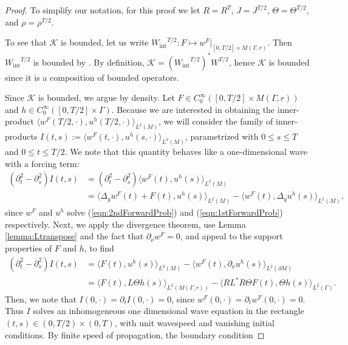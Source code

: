 \documentclass[final,leqno]{siamart1116}
\begin{document}
\begin{proof}
  To simplify our notation, for this proof we let $R = R^T$, $J =
  J^{T/2}$, $\Theta = \Theta^{T/2}$, and $\rho = \rho^{T/2}$.

  To see that ${\mathcal{K}}$ is bounded, let us write ${W_{\text{int}}}^{T/2} : F
  \mapsto w^F|_{[0,T/2] \times M(\Gamma,r)}$. Then ${W_{\text{int}}}^{T/2}$ is
  bounded by \cite{Lions1972a}. By definition, ${\mathcal{K}} =
  ({W_{\text{int}}}^{T/2})^* W^{T/2}$, hence ${\mathcal{K}}$ is bounded since it is a
  composition of bounded operators.
  

  Since ${\mathcal{K}}$ is bounded, we  argue by density. Let
  $F \in C_0^\infty([0,T/2] \times M(\Gamma,r))$ and $h \in
  C_0^\infty([0,T/2] \times \Gamma)$.  Because we are interested in
  obtaining the inner-product $\langle
  w^F(T/2,\cdot),u^h(T/2,\cdot)\rangle_{L^2(M)}$, we will consider the
  family of inner-products $I(t,s) := \langle
  w^F(t,\cdot),u^h(s,\cdot)\rangle_{L^2(M)}$, parametrized with $0\leq
  s \leq T$ and $0 \leq t \leq T/2$. We note that this quantity
  behaves like a one-dimensional wave with a forcing term:
  \begin{align*}
    ({\partial}_t^2 - {\partial}_s^2)I(t,s) &=({\partial}_t^2 - {\partial}_s^2) \langle w^F(t), u^h(s)\rangle_{L^2(M)} \\
                            &=\langle \Delta_g w^F(t) + F(t), u^h(s) \rangle_{L^2(M)} - \langle w^F(t), \Delta_g u^h(s)\rangle_{L^2(M)},
  \end{align*}
  since $w^F$ and $u^h$ solve (\ref{eqn:2ndForwardProb}) and
  (\ref{eqn:1stForwardProb}) respectively. Next, we apply the
  divergence theorem, use Lemma \ref{lemma:Ltranspose} and the fact
  that ${\partial}_\nu w^F = 0$, and appeal to the support properties of $F$
  and $h$, to find
  \begin{align*}
    ({\partial}_t^2 - {\partial}_s^2)I(t,s) &= \langle F(t), u^h(s) \rangle_{L^2(M)} - \langle w^F(t), {\partial}_\nu u^h(s) \rangle_{L^2({\partial} M)}\\
    &=\langle F(t), L  \Theta h(s) \rangle_{L^2(M(\Gamma,r))} - \langle RL^* R \Theta F(t), \Theta h(s)\rangle_{L^2(\Gamma)}.
  \end{align*}
  Then, we note that $I(0,\cdot) = {\partial}_t I(0,\cdot) = 0$, since
  $w^F(0,\cdot) = \partial_t w^F(0,\cdot) = 0$.  Thus $I$ solves an
  inhomogeneous one dimensional wave equation in the rectangle $(t,s)
  \in (0,T/2)\times(0,T)$, with unit wavespeed and vanishing initial
  conditions. By finite speed of propagation, the boundary condition

\end{proof}
\end{document}
